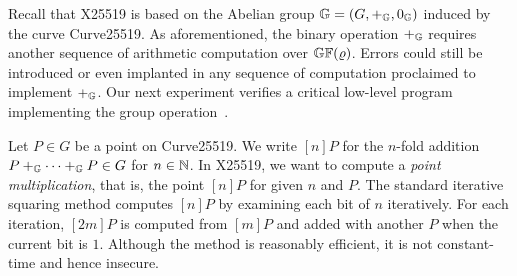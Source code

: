 
Recall that X25519 is based on the Abelian group $\mathbb{G} = (G, +_{\mathbb{G}},
0_{\mathbb{G}})$ induced by the curve Curve25519. As aforementioned, the binary
operation $+_{\mathbb{G}}$ requires another sequence of arithmetic computation
over $\mathbb{GF}(\varrho)$. Errors could still be introduced or even
implanted in any sequence of computation proclaimed to implement $+_{\mathbb{G}}$.
Our next experiment verifies a critical low-level program implementing
the group operation~\cite{BDL+:11:HSHSS,BDL+:12:HSHSS}.

Let $P \in G$ be a point on Curve25519. We write $[n]P$ for the
$n$-fold addition ${P +_{\mathbb{G}} \cdots +_{\mathbb{G}} P} \in G$ for $n \in \mathbb{N}$.
In X25519, we want to compute a \emph{point multiplication}, that is,
the point $[n]P$ for given $n$ and $P$. The standard iterative
squaring method computes $[n]P$ by examining each bit of $n$ iteratively.
For each iteration, $[2m]P$ is computed from $[m]P$ and
added with another $P$ when the current bit is $1$. Although the
method is reasonably efficient, it is not constant-time and hence insecure.



